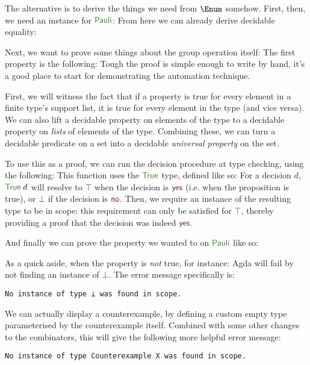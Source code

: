 The alternative is to derive the things we need from \(\Enum\) somehow.
First, then, we need an instance for \(\AgdaDatatype{Pauli}\):
From here we can already derive decidable equality:

Next, we want to prove some things about the group operation itself:
The first property is the following:
Tough the proof is simple enough to write by hand, it's a good place to start
for demonstrating the automation technique.

First, we will witness the fact that if a property is true for every element in
a finite type's support list, it is true for every element in the type (and vice
versa).
We can also lift a decidable property on elements of the type to a decidable
property on \emph{lists} of elements of the type.
Combining these, we can turn a decidable predicate on a set into a decidable
\emph{universal property} on the set.

To use this as a proof, we can run the decision procedure at type checking,
using the following:
This function uses the \(\AgdaDatatype{True}\) type, defined like so:
For a decision \(d\), \(\AgdaDatatype{True}\; d\) will resolve to \(\top\) when
the decision is \(\AgdaInductiveConstructor{yes}\) (i.e. when the proposition is
true), or \(\bot\) if the decision is \(\AgdaInductiveConstructor{no}\).
Then, we require an instance of the resulting type to be in scope: this
requirement can only be satisfied for \(\top\), thereby providing a proof that
the decision was indeed \(\AgdaInductiveConstructor{yes}\).

And finally we can prove the property we wanted to on \(\AgdaDatatype{Pauli}\)
like so:

As a quick aside, when the property is \emph{not} true, for instance:
Agda will fail by not finding an instance of \(\bot\).
The error message specifically is:
\begin{displayquote}
  \verb+No instance of type ⊥ was found in scope.+
\end{displayquote}
We can actually display a counterexample, by defining a custom empty type
parameterised by the counterexample itself.
Combined with some other changes to the combinators, this will give the
following more helpful error message:
\begin{displayquote}
  \verb+No instance of type Counterexample X was found in scope.+
\end{displayquote}
